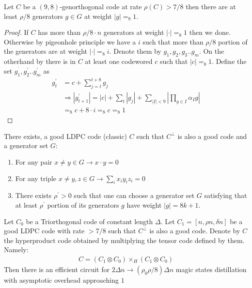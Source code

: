 \documentclass[manuscript,screen,review]{acmart}
\begin{document}
\begin{claim}
  Let $C$ be a $(9,8)$-genorthogonal code at rate $\rho(C) > 7/8 $ then there are at least $\rho/8$ generators $g \in G$ at weight $|g| =_{8} 1$.
\end{claim}
\begin{proof}
  If $C$ has more than $\rho/8 \cdot n$ generators at weight $| \cdot | =_{8} 1$ then we done. Otherwise by pigeonhole principle we have a $i$ such that more than $\rho/8$ portion of the generators are at weight $ |\cdot| =_{8} i$. Denote them by $g_{1},g_{2},g_{3}..g_{m}$. On the otherhand by  there is in $C$ at least one codewored $c$ such that $|c| =_{8} 1$. Define the set $g_{1}^{^\prime},g_{2}^{\prime}..g_{m}^{\prime}$ as   
  \begin{equation*}
    \begin{split}
      g^{\prime}_{t} & = c + \sum_{j=t}^{t+8}g_{j} \\
      & \Rightarrow |g^{\prime}_{t+1}| = |c| + \sum_{t}{ |g_{j}| } + \sum_{|I|<9}\left|\prod_{g \in I} \alpha_{I} g \right| \\
      & =_{8} c + 8\cdot i =_{8} c =_{8} 1  
    \end{split}
  \end{equation*} 
\end{proof}

\begin{claim}
  There exists, a good LDPC code (classic) $C$ such that $C^{\perp}$ is also a good code and a generator set $G$:  
  \begin{enumerate}
    \item For any pair $x \neq y \in G \rightarrow x\cdot y = 0$
    \item For any triple $x\neq y,z \in G \rightarrow \sum_{i}x_{i}y_{i}z_{i} = 0$
    \item  There exists $\rho^{\prime} > 0$ such that one can choose a generator set $G$ satisfying that at least $\rho^{\prime}$ portion of its generators $g$ have weight $|g| = 8k + 1$.
  \end{enumerate}
\end{claim}


\begin{claim} 
Let $C_0$ be a Triorthogonal code of constant length $\Delta$. Let $C_1 = [n, \rho n, \delta n]$ be a good LDPC code with rate $>7/8$ such that $C^{\perp}$ is also a good code. Denote by $C$ the hyperproduct code obtained by multiplying the tensor code defined by them. Namely:
  \begin{equation*}
    \begin{split}
      C = \left( C_{1} \otimes C_{0} \right) \times_{H} \left( C_{1} \otimes C_{0} \right)
    \end{split}
  \end{equation*} 
Then there is an efficient circuit for $2\Delta n \rightarrow (\rho_{0}\rho/8) \Delta n$ magic states distillation with asymptotic overhead approaching $1$ 
\end{claim}
\end{document}
